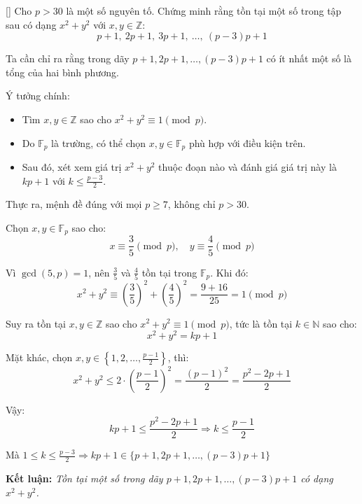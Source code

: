 \documentclass[../09-contruction-methods.tex]{subfiles}
\begin{document}
\begin{example*}\label{example:IRN-2015-MO-N5}[\textbf{}]
    Cho \( p > 30 \) là một số nguyên tố. Chứng minh rằng tồn tại một số trong tập sau có dạng \( x^2 + y^2 \) với \( x, y \in \mathbb{Z} \):
    \[
        p + 1,\ 2p + 1,\ 3p + 1,\ \dots,\ (p - 3)p + 1
    \]
\end{example*}

\begin{story*}
    Ta cần chỉ ra rằng trong dãy \( p + 1, 2p + 1, \dots, (p - 3)p + 1 \) có ít nhất một số là tổng của hai bình phương.

    Ý tưởng chính:
    \begin{itemize}[topsep=0pt, partopsep=0pt, itemsep=0pt]
        \item Tìm \( x, y \in \mathbb{Z} \) sao cho \( x^2 + y^2 \equiv 1 \pmod{p} \).
        \item Do \( \mathbb{F}_p \) là trường, có thể chọn \( x, y \in \mathbb{F}_p \) phù hợp với điều kiện trên.
        \item Sau đó, xét xem giá trị \( x^2 + y^2 \) thuộc đoạn nào và đánh giá giá trị này là \( kp + 1 \) với \( k \le \frac{p - 3}{2} \).
    \end{itemize}
\end{story*}

\begin{soln}\footnotemark
    Thực ra, mệnh đề đúng với mọi \( p \ge 7 \), không chỉ \( p > 30 \).

    Chọn \( x, y \in \mathbb{F}_p \) sao cho:
    \[
        x \equiv \frac{3}{5} \pmod{p}, \quad y \equiv \frac{4}{5} \pmod{p}
    \]
	
    Vì \( \gcd(5, p) = 1 \), nên \( \tfrac{3}{5} \) và \( \tfrac{4}{5} \) tồn tại trong \( \mathbb{F}_p \). Khi đó:
    \[
        x^2 + y^2 \equiv \left( \frac{3}{5} \right)^2 + \left( \frac{4}{5} \right)^2 = \frac{9 + 16}{25} = 1 \pmod{p}
    \]

    Suy ra tồn tại \( x, y \in \mathbb{Z} \) sao cho \( x^2 + y^2 \equiv 1 \pmod{p} \), tức là tồn tại \( k \in \mathbb{N} \) sao cho:
    \[
        x^2 + y^2 = kp + 1
    \]

    Mặt khác, chọn \( x, y \in \left\{1, 2, \dotsc, \frac{p - 1}{2} \right\} \), thì:
    \[
        x^2 + y^2 \le 2 \cdot \left( \frac{p - 1}{2} \right)^2 = \frac{(p - 1)^2}{2} = \frac{p^2 - 2p + 1}{2}
    \]

    Vậy:
    \[
        kp + 1 \le \frac{p^2 - 2p + 1}{2} \Rightarrow k \le \frac{p - 1}{2}
    \]

    Mà \( 1 \le k \le \frac{p - 3}{2} \Rightarrow kp + 1 \in \{p + 1, 2p + 1, \dotsc, (p - 3)p + 1\} \)

    \textbf{Kết luận:} \textit{Tồn tại một số trong dãy \( p + 1, 2p + 1, \dotsc, (p - 3)p + 1 \) có dạng \( x^2 + y^2 \).}
\end{soln}

\end{document}
